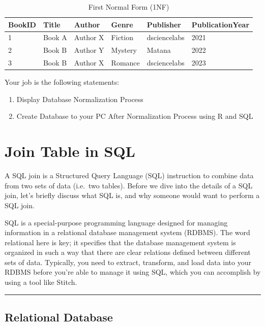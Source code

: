 \documentclass[
]{book}
\providecommand{\tightlist}{%
  \setlength{\itemsep}{0pt}\setlength{\parskip}{0pt}}
\begin{document}
\begin{table}

\caption{\label{tab:unnamed-chunk-61}First Normal Form (1NF)}
\centering
\begin{tabular}[t]{l|l|l|l|l|l}
\hline
BookID & Title & Author & Genre & Publisher & PublicationYear\\
\hline
1 & Book A & Author X & Fiction & dsciencelabs & 2021\\
\hline
2 & Book B & Author Y & Mystery & Matana & 2022\\
\hline
3 & Book B & Author X & Romance & dsciencelabs & 2023\\
\hline
\end{tabular}
\end{table}

Your job is the following statements:

\begin{enumerate}
\def\labelenumi{\arabic{enumi}.}
\tightlist
\item
  Display Database Normalization Process
\item
  Create Database to your PC After Normalization Process using R and SQL
\end{enumerate}

\hypertarget{join-table-in-sql}{%
\chapter{Join Table in SQL}\label{join-table-in-sql}}

A SQL join is a Structured Query Language (SQL) instruction to combine data from two sets of data (i.e.~two tables). Before we dive into the details of a SQL join, let's briefly discuss what SQL is, and why someone would want to perform a SQL join.

SQL is a special-purpose programming language designed for managing information in a relational database management system (RDBMS). The word relational here is key; it specifies that the database management system is organized in such a way that there are clear relations defined between different sets of data. Typically, you need to extract, transform, and load data into your RDBMS before you're able to manage it using SQL, which you can accomplish by using a tool like Stitch.

\begin{center}\rule{0.5\linewidth}{0.5pt}\end{center}

\hypertarget{relational-database}{%
\section{Relational Database}\label{relational-database}}
\end{document}
